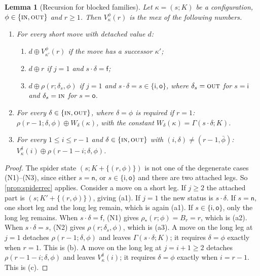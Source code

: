 \documentclass[11pt]{amsart}
\newtheorem{lemma}[theorem]{Lemma}
\theoremstyle{definition}
\theoremstyle{remark}
\newcommand{\sn}{\mathsf{n}}
\newcommand{\si}{\mathsf{i}}
\newcommand{\so}{\mathsf{o}}
\newcommand{\sff}{\mathsf{f}}
\newcommand{\free}{\ast}
\newcommand{\IN}{\textup{\textsc{in}}}
\newcommand{\OUT}{\textup{\textsc{out}}}
\begin{document}
\begin{lemma}[Recursion for blocked families]\label{lem:famrec}
Let $\kappa=(s;K)$ be a configuration, $\phi\in\{\IN,\OUT\}$ and $r\ge1$. Then $V^\phi_\kappa(r)$ is the mex of the following numbers.
\begin{enumerate}[label=\textup{(\alph*)},leftmargin=*]
\item For every short move with detached value $d$:
 \begin{enumerate}[label=\textup{(a\arabic*)},leftmargin=*]
 \item $d\oplus V^\phi_{\kappa'}(r)$ if the move has a successor $\kappa'$;
 \item $d\oplus r$ if $j=1$ and $s\cdot\delta=\sff$;
 \item $d\oplus \rho(r;\delta_s,\phi)$ if $j=1$ and $s\cdot\delta=s\in\{\si,\so\}$, where $\delta_s=\OUT$ for $s=\si$ and $\delta_s=\IN$ for $s=\so$.
 \end{enumerate}
\item For every $\delta\in\{\IN,\OUT\}$, where $\delta=\phi$ is required if $r=1$: $\rho(r-1;\delta,\phi)\oplus W_\delta(\kappa)$, with the constant $W_\delta(\kappa)=\Gamma(s\cdot\delta;K)$.
\item For every $1\le i\le r-1$ and $\delta\in\{\IN,\OUT\}$ with $(i,\delta)\ne(r-1,\bar\phi)$: $V^\delta_\kappa(i)\oplus\rho(r-1-i;\delta,\phi)$.
\end{enumerate}
\end{lemma}

\begin{proof}
The spider state $(s;K+\{(r,\phi)\})$ is not one of the degenerate cases (N1)--(N3), since either $s=\sn$, or $s\in\{\si,\so\}$ and there are two attached legs. So \cref{prop:spiderrec} applies. Consider a move on a short leg. If $j\ge2$ the attached part is $(s;K'+\{(r,\phi)\})$, giving (a1). If $j=1$ the new status is $s\cdot\delta$. If $s=\sn$, one short leg and the long leg remain, which is again (a1). If $s\in\{\si,\so\}$, only the long leg remains. When $s\cdot\delta=\sff$, (N1) gives $\rho_\free(r;\phi)=B_r=r$, which is (a2). When $s\cdot\delta=s$, (N2) gives $\rho(r;\delta_s,\phi)$, which is (a3). A move on the long leg at $j=1$ detaches $\rho(r-1;\delta,\phi)$ and leaves $\Gamma(s\cdot\delta;K)$; it requires $\delta=\phi$ exactly when $r=1$. This is (b). A move on the long leg at $j=i+1\ge2$ detaches $\rho(r-1-i;\delta,\phi)$ and leaves $V^\delta_\kappa(i)$; it requires $\delta=\phi$ exactly when $i=r-1$. This is (c).
\end{proof}
\end{document}
